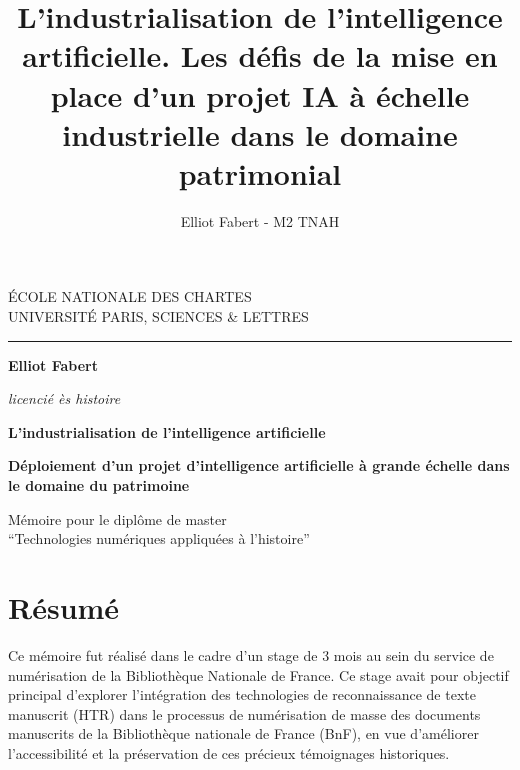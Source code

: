 \documentclass[a4paper,12pt,twoside]{book}
\author{Elliot Fabert - M2 TNAH}
\title{L'industrialisation de l'intelligence artificielle. Les défis de la mise en place d'un projet IA à échelle industrielle dans le domaine patrimonial}
\begin{document}
	\begin{titlepage}
		\begin{center}
			
			\bigskip
			
			\begin{large}				
				ÉCOLE NATIONALE DES CHARTES\\
				UNIVERSITÉ PARIS, SCIENCES \& LETTRES
			\end{large}
			\begin{center}\rule{2cm}{0.02cm}\end{center}
			
			\bigskip
			\bigskip
			\bigskip
			\begin{Large}
				\textbf{Elliot Fabert}\\
			\end{Large}
			\begin{normalsize} \textit{licencié ès histoire}\\
			\end{normalsize}
			
			\bigskip
			\bigskip
			\bigskip
			
			\begin{Huge}
				\textbf{L'industrialisation de l'intelligence artificielle}\\
			\end{Huge}
			\bigskip
			\bigskip
			\begin{LARGE}
				\textbf{Déploiement d’un projet d’intelligence artificielle à grande échelle dans le domaine du patrimoine}\\
			\end{LARGE}
			
			\bigskip
			\bigskip
			\bigskip
			\begin{large}
			\end{large}
			\vfill
			
			\begin{large}
				Mémoire 
				pour le diplôme de master \\
				\enquote{Technologies numériques appliquées à l'histoire} \\
			\end{large}
			
		\end{center}
	\end{titlepage}

	\thispagestyle{empty}	
	\cleardoublepage
	
\frontmatter

	\chapter{Résumé}
\medskip
Ce mémoire fut réalisé dans le cadre d'un stage de 3 mois au sein du service de numérisation de la Bibliothèque Nationale de France. Ce stage avait pour objectif principal d'explorer l'intégration des technologies de reconnaissance de texte manuscrit (HTR) dans le processus de numérisation de masse des documents manuscrits de la Bibliothèque nationale de France  (BnF), en vue d'améliorer l'accessibilité et la préservation de ces précieux témoignages historiques.
	
\end{document}
